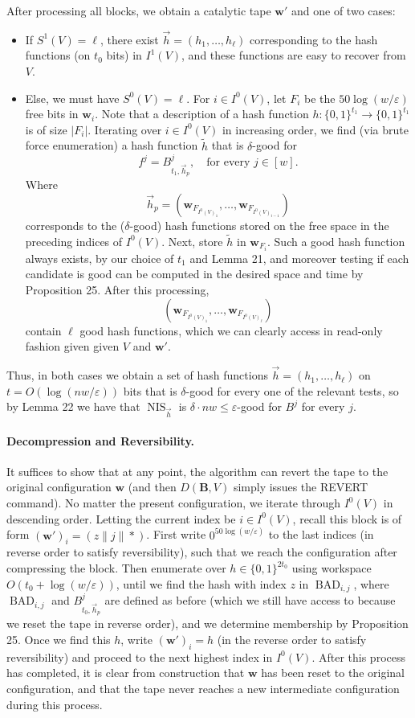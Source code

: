 \documentclass[10pt,a4paper]{article}
\begin{document}
After processing all blocks, we obtain a catalytic tape $\mathbf w'$ and one of two cases:
\begin{itemize}
\item If $S^1(V)=\ell$, there exist $\vec h=(h_1,\ldots,h_\ell)$ corresponding to the hash functions (on $t_0$ bits) in $I^1(V)$, and these functions are easy to recover from $V$.
\item Else, we must have $S^0(V)=\ell$. For $i\in I^0(V)$, let $F_i$ be the $50\log(w/\varepsilon)$ free bits in $\mathbf w_i$. Note that a description of a hash function $h:\{0,1\}^{t_1}\to\{0,1\}^{t_1}$ is of size $|F_i|$. Iterating over $i\in I^0(V)$ in increasing order, we find (via brute force enumeration) a hash function $\widetilde h$ that is $\delta$-good for
\[f^j=B^j_{t_1,\vec h_p},\quad\text{for every }j\in[w].\]
Where
\[\vec h_p=(\mathbf w_{F_{I^0(V)_1}},\ldots,\mathbf w_{F_{I^0(V)_{i-1}}})\]
corresponds to the ($\delta$-good) hash functions stored on the free space in the preceding indices of $I^0(V)$. Next, store $\widetilde h$ in $\mathbf w_{F_i}$. Such a good hash function always exists, by our choice of $t_1$ and Lemma 21, and moreover testing if each candidate is good can be computed in the desired space and time by Proposition 25. After this processing,
\[(\mathbf w_{F_{I^0(V)_1}},\ldots,\mathbf w_{F_{I^0(V)_\ell}})\]
contain $\ell$ good hash functions, which we can clearly access in read-only fashion given given $V$ and $\mathbf w'$.
\end{itemize}
Thus, in both cases we obtain a set of hash functions $\vec h=(h_1,\ldots,h_\ell)$ on $t=O(\log(nw/\varepsilon))$ bits that is $\delta$-good for every one of the relevant tests, so by Lemma 22 we have that $\operatorname{NIS}_{\vec h}$ is $\delta\cdot nw\leq\varepsilon$-good for $B^j$ for every $j$.
\paragraph{Decompression and Reversibility.} It suffices to show that at any point, the algorithm can revert the tape to the original configuration $\mathbf w$ (and then $D(\mathbf B,V)$ simply issues the REVERT command). No matter the present configuration, we iterate through $I^0(V)$ in descending order. Letting the current index be $i\in I^0(V)$, recall this block is of form $(\mathbf w')_i=(z\|j\|*)$. First write $0^{50\log(w/\varepsilon)}$ to the last indices (in reverse order to satisfy reversibility), such that we reach the configuration after compressing the block. Then enumerate over $h\in\{0,1\}^{2t_0}$ using workspace $O(t_0+\log(w/\varepsilon))$, until we find the hash with index $z$ in $\operatorname{BAD}_{i,j}$, where $\operatorname{BAD}_{i,j}$ and $B^j_{t_0,\vec h_p}$ are defined as before (which we still have access to because we reset the tape in reverse order), and we determine membership by Proposition 25.
Once we find this $h$, write $(\mathbf w')_i=h$ (in the reverse order to satisfy reversibility) and proceed to the next highest index in $I^0(V)$. After this process has completed, it is clear from construction that $\mathbf w$ has been reset to the original configuration, and that the tape never reaches a new intermediate configuration during this process.
\end{document}
